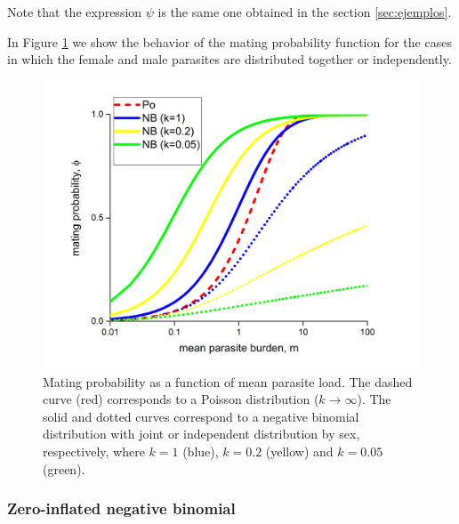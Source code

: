 \documentclass[12pt,a4paper]{article}
\theoremstyle{plain}%
\theoremstyle{definition}
\theoremstyle{remark}
\begin{document}
Note that the expression $\psi$ is the same one obtained in the section \ref{sec:ejemplos}.

	In Figure \ref{fig:funphi} we show the behavior of the mating probability function for the cases in which the female and male parasites are distributed together or independently.

\begin{figure}
	\centering 	\includegraphics[width=0.9\linewidth]{phi-indep}
	\caption{Mating probability as a function of mean parasite load. The dashed curve (red) corresponds to a Poisson distribution ($k\to \infty$). The solid and dotted curves correspond to a negative binomial distribution with joint or independent distribution by sex, respectively, where $k = 1$ (blue), $k =0.2$ (yellow) and $k =0.05$ (green).
	} 
	\label{fig:funphi}
\end{figure}

	\subsubsection{Zero-inflated negative binomial}
\end{document}
